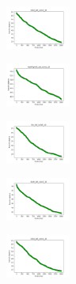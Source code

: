 \begin{figure}[H]
    \begin{subfigure}
        \centering
        \includegraphics[width=0.234\textwidth]{img/agesf/rand_set_const_10_277451237_cost.png}
    \end{subfigure}
    \hfill
    \begin{subfigure}
        \centering
        \includegraphics[width=0.234\textwidth]{img/agesf/newthyroid_set_const_10_277451237_cost.png}
    \end{subfigure}
    \hfill
    \begin{subfigure}
        \centering
        \includegraphics[width=0.234\textwidth]{img/agesf/iris_set_const_10_49258669_cost.png}
    \end{subfigure}
    \hfill
    \begin{subfigure}
        \centering
        \includegraphics[width=0.234\textwidth]{img/agesf/ecoli_set_const_10_49258669_cost.png}
    \end{subfigure}
    \hfill
    \begin{subfigure}
        \centering
        \includegraphics[width=0.234\textwidth]{img/agesf/rand_set_const_10_49258669_cost.png}
    \end{subfigure}
    \hfill
    \begin{subfigure}
        \centering

\end{subfigure}
\end{figure}
